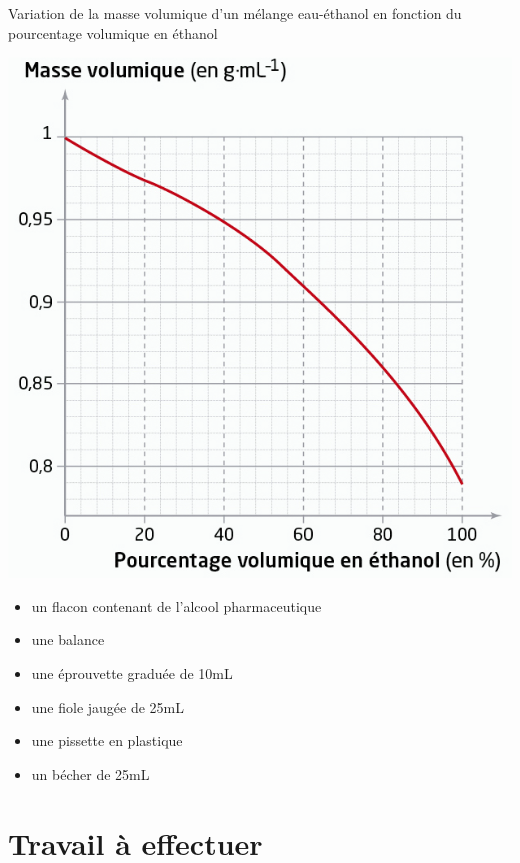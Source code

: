 \begin{multicols}{2}
\begin{doc}{Variation de la masse volumique d’un mélange eau-éthanol en fonction du pourcentage volumique en éthanol}
\begin{center}
    \includegraphics[scale=0.75]{Images/TP3/Masse_vol_ethanol.png}
\end{center}
\end{doc}

\end{multicols}

\newpage

\begin{mdframed}[style=autreexo]
\textbf{}
\begin{itemize}
    \item un flacon contenant de l'alcool pharmaceutique
    \item une balance
    \item une éprouvette graduée de 10mL
    \item une fiole jaugée de 25mL
    \item une pissette en plastique
    \item un bécher de 25mL 
\end{itemize}
\end{mdframed}


\section{Travail à effectuer}

